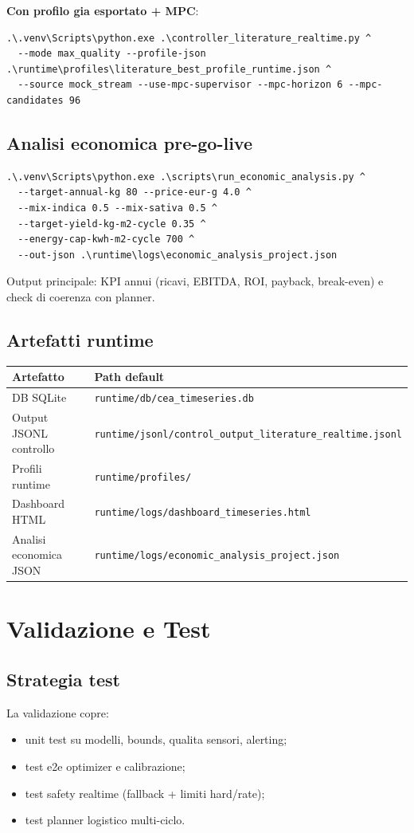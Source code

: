 ﻿\documentclass[11pt,a4paper]{report}
\begin{document}
\textbf{Con profilo gia esportato + MPC}:
\begin{lstlisting}
.\.venv\Scripts\python.exe .\controller_literature_realtime.py ^
  --mode max_quality --profile-json .\runtime\profiles\literature_best_profile_runtime.json ^
  --source mock_stream --use-mpc-supervisor --mpc-horizon 6 --mpc-candidates 96
\end{lstlisting}

\section{Analisi economica pre-go-live}
\begin{lstlisting}
.\.venv\Scripts\python.exe .\scripts\run_economic_analysis.py ^
  --target-annual-kg 80 --price-eur-g 4.0 ^
  --mix-indica 0.5 --mix-sativa 0.5 ^
  --target-yield-kg-m2-cycle 0.35 ^
  --energy-cap-kwh-m2-cycle 700 ^
  --out-json .\runtime\logs\economic_analysis_project.json
\end{lstlisting}
Output principale: KPI annui (ricavi, EBITDA, ROI, payback, break-even) e check di coerenza con planner.

\section{Artefatti runtime}
\begin{longtable}{@{}p{4.2cm}p{7.8cm}@{}}
\toprule
Artefatto & Path default \\ \midrule
DB SQLite & \texttt{runtime/db/cea\_timeseries.db} \\
Output JSONL controllo & \texttt{runtime/jsonl/control\_output\_literature\_realtime.jsonl} \\
Profili runtime & \texttt{runtime/profiles/} \\
Dashboard HTML & \texttt{runtime/logs/dashboard\_timeseries.html} \\
Analisi economica JSON & \texttt{runtime/logs/economic\_analysis\_project.json} \\
\bottomrule
\end{longtable}

\newpage
\chapter{Validazione e Test}

\section{Strategia test}
La validazione copre:
\begin{itemize}
  \item unit test su modelli, bounds, qualita sensori, alerting;
  \item test e2e optimizer e calibrazione;
  \item test safety realtime (fallback + limiti hard/rate);
  \item test planner logistico multi-ciclo.
\end{itemize}
\end{document}
